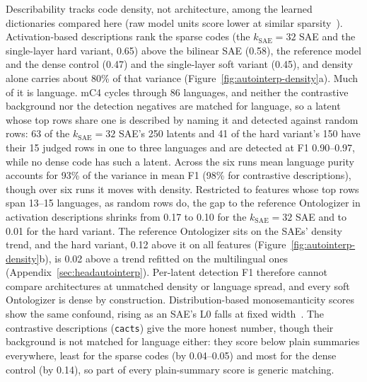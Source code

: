 Describability tracks code density, not architecture, among the learned
dictionaries compared here (raw model units score lower at similar
sparsity~\cite{paulo2025}). Activation-based
descriptions rank the sparse codes (the $k_{\mathrm{SAE}}{=}32$ SAE and the
single-layer hard variant, 0.65) above the bilinear SAE (0.58), the
reference model and the dense control (0.47) and the single-layer soft
variant (0.45), and density alone carries about 80\% of that variance
(Figure~\ref{fig:autointerp-density}a). Much of it is language. mC4
cycles through 86 languages, and neither the contrastive background nor
the detection negatives are matched for language, so a latent whose top
rows share one is described by naming it and detected against random
rows: 63 of the $k_{\mathrm{SAE}}{=}32$ SAE's 250 latents and 41 of the
hard variant's 150 have their 15 judged rows in one to three languages
and are detected at F1 0.90--0.97, while no dense code has such a latent.
Across the six runs mean language purity accounts for 93\% of the
variance in mean F1 (98\% for contrastive descriptions), though over six
runs it moves with density. Restricted to features whose top rows span
13--15 languages, as random rows do, the gap to the reference Ontologizer
in activation descriptions shrinks from 0.17 to 0.10 for the
$k_{\mathrm{SAE}}{=}32$ SAE and to 0.01 for the hard variant. The reference Ontologizer sits on the SAEs' density
trend, and the hard variant, 0.12 above it on all features
(Figure~\ref{fig:autointerp-density}b), is 0.02 above a trend refitted on
the multilingual ones (Appendix~\ref{sec:headautointerp}). Per-latent
detection F1 therefore cannot compare architectures at unmatched density
or language spread, and every soft Ontologizer is dense by construction.
Distribution-based monosemanticity
scores show the same confound, rising as an SAE's L0 falls at fixed
width~\cite{fereidouni2025evaluatingsparseautoencodersmonosemantic}. The contrastive descriptions
(\texttt{cacts}) give the more honest number, though their background is
not matched for language either: they score below plain summaries
everywhere, least for the sparse codes (by 0.04--0.05) and most for the
dense control (by 0.14), so part of every plain-summary score is generic
matching.

